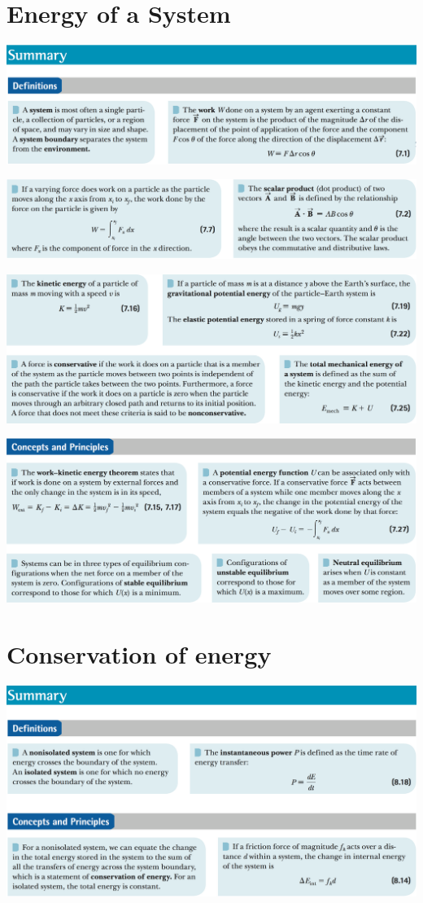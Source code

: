 \documentclass[12pt,a4paper]{article}
\newcommand{\N}{\noindent}
\begin{document}
	\section{Energy of a System}
		\N \includegraphics[scale=.42]{7_a.png}
		
		\vspace{2mm}
		\N \includegraphics[scale=.42]{7_b.png}		

		\vspace{2mm}
		\N \includegraphics[scale=.42]{7_c.png}
		
		\vspace{2mm}
		\N \includegraphics[scale=.42]{7_d.png}
		
	\section{Conservation of energy}
		\N \includegraphics[scale=.42]{8_a.png}
		
\end{document}

